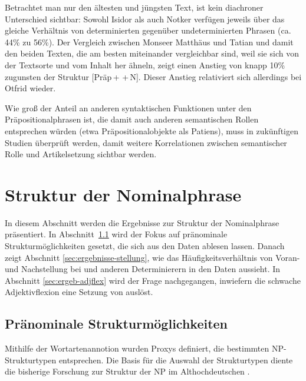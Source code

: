 Betrachtet man nur den ältesten und jüngsten Text, ist kein diachroner Unterschied sichtbar: Sowohl Isidor als auch Notker verfügen jeweils über das gleiche Verhältnis von determinierten gegenüber undeterminierten Phrasen  (ca. 44\% zu 56\%). Der Vergleich zwischen Monseer Matthäus und Tatian und damit den beiden Texten, die am besten miteinander vergleichbar sind, weil sie sich von der Textsorte und vom Inhalt her ähneln, zeigt einen Anstieg von knapp 10\% zugunsten der Struktur [Präp\,+\,\,+\,N]. Dieser Anstieg relativiert sich allerdings bei Otfrid wieder.  

Wie groß der Anteil an anderen syntaktischen Funktionen unter den Präpositionalphrasen  ist, die damit auch anderen semantischen Rollen  entsprechen würden (etwa Präpositionalobjekte  als Patiens), muss in zukünftigen Studien überprüft werden, damit weitere Korrelationen zwischen semantischer Rolle  und Artikelsetzung sichtbar werden. 


\section{Struktur der Nominalphrase}\label{erg:struktur.np}

In diesem Abschnitt werden die Ergebnisse zur Struktur der Nominalphrase präsentiert. In Abschnitt~\ref{sec:ergeb-np-struktur} wird der Fokus auf pränominale Strukturmöglichkeiten gesetzt, die sich aus den Daten ablesen lassen. Danach zeigt Abschnitt \ref{sec:ergebnisse-stellung}, wie das Häufigkeitsverhältnis von Voran- und Nachstellung bei  und anderen Determinierern  in den Daten aussieht. In Abschnitt \ref{sec:ergeb-adjflex} wird der Frage nachgegangen, inwiefern die schwache Adjektivflexion eine Setzung von   auslöst. 

\subsection{Pränominale Strukturmöglichkeiten}\label{sec:ergeb-np-struktur}

Mithilfe der Wortartenannotion wurden Proxys  definiert, die bestimmten NP-Strukturtypen  entsprechen. Die Basis für die Auswahl der Strukturtypen diente die bisherige Forschung zur Struktur der NP  im Althochdeutschen \parencite[vor allem][]{Oubouzar1989}. 

